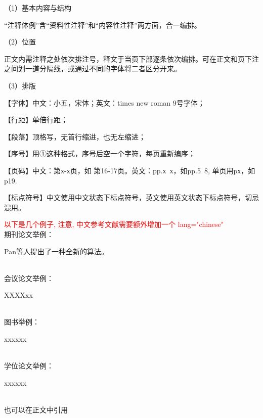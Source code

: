 （1）基本内容与结构

“注释体例”含“资料性注释”和“内容性注释”两方面，合一编排。

（2）位置

正文内需注释之处依次排注号，释文于当页下部逐条依次编排。可在正文和页下注之间划一道分隔线，或通过不同的字体将二者区分开来。

（3）排版

【字体】中文：小五，宋体；英文：times new roman 9号字体；

【行距】单倍行距；

【段落】顶格写，无首行缩进，也无左缩进；

【序号】用①这种格式，序号后空一个字符，每页重新编序；

【页码】中文：第х-х页，如 第16-17页。英文：pp.х~х，如pp.5~8, 单页用pх，如p19.

【标点符号】中文使用中文状态下标点符号，英文使用英文状态下标点符号，切忌混用。

\textcolor{red}{以下是几个例子, 注意, 中文参考文献需要额外增加一个 lang="chinese"}
~\\
期刊论文举例：

Pan等人提出了一种全新的算法\cite{pan2018classification, pan2014cell, song2013asynchronous, lin2022adaptive}。

~\\
会议论文举例：

XXXXxx\cite{li2021large}

~\\
图书举例：

xxxxxx\cite{shavlik1990readings, yan2006CFG}

~\\
学位论文举例：

xxxxxx\cite{jxd1996, CCPT}

~\\
也可以在正文中引用



